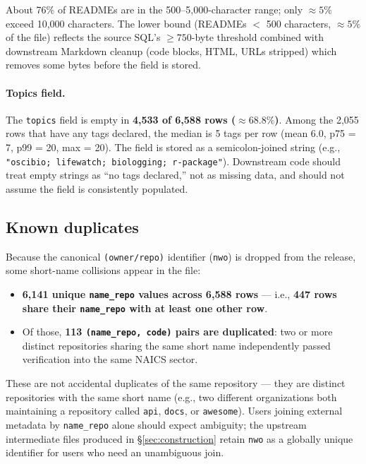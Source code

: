 \documentclass{article}
\begin{document}
About 76\% of READMEs are in the 500--5{,}000-character range; only
$\approx 5\%$ exceed 10{,}000 characters. The lower bound (READMEs
$<$ 500 characters, $\approx 5\%$ of the file) reflects the source
SQL's $\geq 750$-byte threshold combined with downstream Markdown
cleanup (code blocks, HTML, URLs stripped) which removes some bytes
before the field is stored.

\paragraph{Topics field.}
The \texttt{topics} field is empty in \textbf{4{,}533 of 6{,}588 rows
($\approx 68.8\%$)}. Among the 2{,}055 rows that have any tags
declared, the median is 5 tags per row (mean 6.0, p75 = 7, p99 =
20, max = 20). The field is stored as a semicolon-joined string
(e.g., \texttt{"oscibio;\,lifewatch;\,biologging;\,r-package"}).
Downstream code should treat empty strings as ``no tags declared,''
not as missing data, and should not assume the field is consistently
populated.

\subsection{Known duplicates}
\label{sec:desc:dup}

Because the canonical \texttt{(owner/repo)} identifier (\texttt{nwo})
is dropped from the release, some short-name collisions appear in the
file:

\begin{itemize}
  \item \textbf{6{,}141 unique \texttt{name\_repo} values across
    6{,}588 rows} --- i.e., \textbf{447 rows share their
    \texttt{name\_repo} with at least one other row}.
  \item Of those, \textbf{113 \texttt{(name\_repo, code)} pairs are
    duplicated}: two or more distinct repositories sharing the same
    short name independently passed verification into the same NAICS
    sector.
\end{itemize}

These are not accidental duplicates of the same repository --- they
are distinct repositories with the same short name (e.g., two
different organizations both maintaining a repository called
\texttt{api}, \texttt{docs}, or \texttt{awesome}). Users joining
external metadata by \texttt{name\_repo} alone should expect
ambiguity; the upstream intermediate files produced in
\S\ref{sec:construction} retain \texttt{nwo} as a globally unique
identifier for users who need an unambiguous join.
\end{document}
